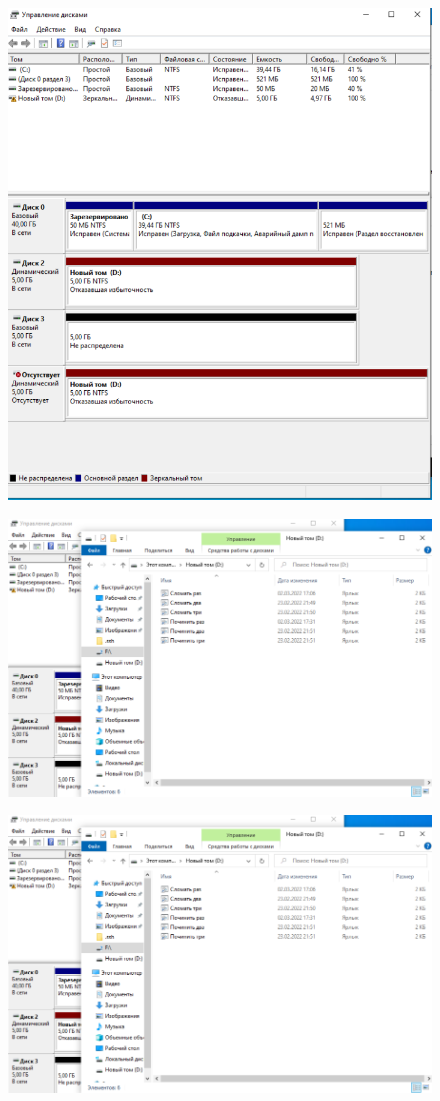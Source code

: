 \documentclass[a4paper,14pt]{extarticle}
\begin{document}
\begin{enumerate}
		\begin{figure}
			\centering
			\includegraphics[width=0.7\linewidth]{screenshot003}
			\caption{}
			\label{fig:screenshot003}
		\end{figure}
		\begin{figure}
			\centering
			\includegraphics[width=0.7\linewidth]{screenshot004}
			\caption{}
			\label{fig:screenshot004}
		\end{figure}
		\begin{figure}
			\centering
			\includegraphics[width=0.7\linewidth]{screenshot005}

\end{figure}
\end{enumerate}
\end{document}
